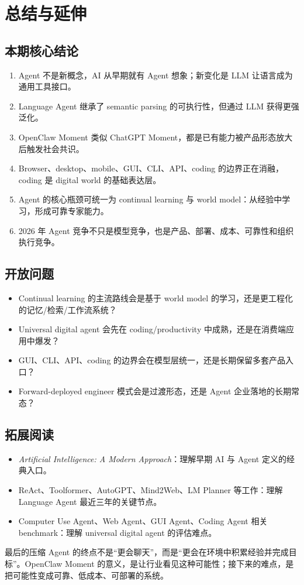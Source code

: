 \section{总结与延伸}

\subsection{本期核心结论}

\begin{enumerate}
\item Agent 不是新概念，AI 从早期就有 Agent 想象；新变化是 LLM 让语言成为通用工具接口。
\item Language Agent 继承了 semantic parsing 的可执行性，但通过 LLM 获得更强泛化。
\item OpenClaw Moment 类似 ChatGPT Moment，都是已有能力被产品形态放大后触发社会共识。
\item Browser、desktop、mobile、GUI、CLI、API、coding 的边界正在消融，coding 是 digital world 的基础表达层。
\item Agent 的核心瓶颈可统一为 continual learning 与 world model：从经验中学习，形成可靠专家能力。
\item 2026 年 Agent 竞争不只是模型竞争，也是产品、部署、成本、可靠性和组织执行竞争。
\end{enumerate}

\subsection{开放问题}

\begin{itemize}
\item Continual learning 的主流路线会是基于 world model 的学习，还是更工程化的记忆/检索/工作流系统？
\item Universal digital agent 会先在 coding/productivity 中成熟，还是在消费端应用中爆发？
\item GUI、CLI、API、coding 的边界会在模型层统一，还是长期保留多套产品入口？
\item Forward-deployed engineer 模式会是过渡形态，还是 Agent 企业落地的长期常态？
\end{itemize}

\subsection{拓展阅读}

\begin{itemize}
\item \textit{Artificial Intelligence: A Modern Approach}：理解早期 AI 与 Agent 定义的经典入口。
\item ReAct、Toolformer、AutoGPT、Mind2Web、LM Planner 等工作：理解 Language Agent 最近三年的关键节点。
\item Computer Use Agent、Web Agent、GUI Agent、Coding Agent 相关 benchmark：理解 universal digital agent 的评估难点。
\end{itemize}

\begin{importantbox}{最后的压缩}
Agent 的终点不是“更会聊天”，而是“更会在环境中积累经验并完成目标”。OpenClaw Moment 的意义，是让行业看见这种可能性；接下来的难点，是把可能性变成可靠、低成本、可部署的系统。
\end{importantbox}


